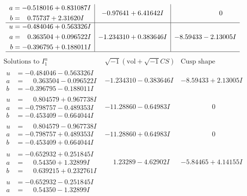 \documentclass[1p]{elsarticle_modified}
\theoremstyle{definition}
\newcommand{\I}{\sqrt{-1}}
\begin{document}
$$\begin{array}{c|c|c}
\begin{aligned}
a &= -0.518016 + 0.831087 I \\
b &= \phantom{-}0.75737 + 2.31620 I\end{aligned}
 & -0.97641 + 6.41642 I & \phantom{-0.000000 } 0 \\ \hline\begin{aligned}
u &= -0.484046 + 0.563326 I \\
a &= \phantom{-}0.363504 + 0.096522 I \\
b &= -0.396795 + 0.188011 I\end{aligned}
 & -1.234310 + 0.383646 I & -8.59433 - 2.13005 I\\
 \hline 
 \end{array}$$\newpage$$\begin{array}{c|c|c}  
\text{Solutions to }I^u_{1}& \I (\text{vol} + \sqrt{-1}CS) & \text{Cusp shape}\\
 \hline 
\begin{aligned}
u &= -0.484046 - 0.563326 I \\
a &= \phantom{-}0.363504 - 0.096522 I \\
b &= -0.396795 - 0.188011 I\end{aligned}
 & -1.234310 - 0.383646 I & -8.59433 + 2.13005 I \\ \hline\begin{aligned}
u &= \phantom{-}0.804579 + 0.967738 I \\
a &= -0.798757 - 0.489353 I \\
b &= -0.453409 - 0.664044 I\end{aligned}
 & -11.28860 - 0.64983 I & \phantom{-0.000000 } 0 \\ \hline\begin{aligned}
u &= \phantom{-}0.804579 - 0.967738 I \\
a &= -0.798757 + 0.489353 I \\
b &= -0.453409 + 0.664044 I\end{aligned}
 & -11.28860 + 0.64983 I & \phantom{-0.000000 } 0 \\ \hline\begin{aligned}
u &= -0.652932 + 0.251845 I \\
a &= \phantom{-}0.54350 + 1.32899 I \\
b &= \phantom{-}0.639215 + 0.232761 I\end{aligned}
 & \phantom{-}1.23289 - 4.62902 I & -5.84465 + 4.14155 I \\ \hline\begin{aligned}
u &= -0.652932 - 0.251845 I \\
a &= \phantom{-}0.54350 - 1.32899 I \\

\end{aligned}
\end{array}$$
\end{document}

